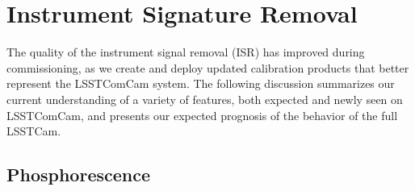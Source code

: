 %
%
%
%

\section{Instrument Signature Removal}
\label{sec:isr}
\newcommand{\czw}[1]{
  \textbf{CZW: }\textcolor{red}{#1}
}
The quality of the instrument signal removal (ISR) has improved during commissioning, as we create and deploy updated calibration products that better represent the LSSTComCam system.
The following discussion summarizes our current understanding of a variety of features, both expected and newly seen on LSSTComCam, and presents our expected prognosis of the behavior of the full LSSTCam.

\subsection{Phosphorescence}

